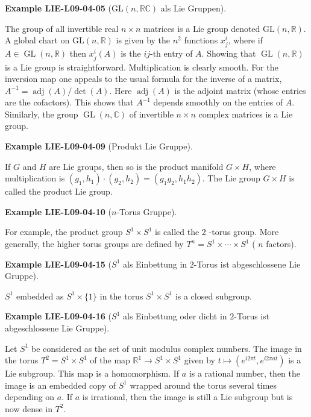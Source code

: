 \documentclass[10pt, letterpaper]{article}
\newcommand{\R}{\mathbb{R}}
\newcommand{\C}{\mathbb{C}}
\newcommand{\GL}{\mathrm{GL}}
\newcommand{\CustomHeading}[3]{%
  \par\medskip\noindent%
  \textbf{#1 #2} \textnormal{(#3)}.\enskip%
}
\newenvironment{EXA}[2]{\CustomHeading{Example}{#1}{#2}}{}
\begin{document}
\begin{EXA}{LIE-L09-04-05}{$\GL(n,\R \C)$ als Lie Gruppen}
The group of all invertible real $n \times n$ matrices is a Lie group denoted $\mathrm{GL}(n, \mathbb{R})$. A global chart on $\mathrm{GL}(n, \mathbb{R})$ is given by the $n^{2}$ functions $x_{j}^{i}$, where if $A \in \operatorname{GL}(n, \mathbb{R})$ then $x_{j}^{i}(A)$ is the $i j$-th entry of $A$. Showing that $\operatorname{GL}(n, \mathbb{R})$ is a Lie group is straightforward. Multiplication is clearly smooth. For the inversion map one appeals to the usual formula for the inverse of a matrix, $A^{-1}= \operatorname{adj}(A) / \operatorname{det}(A)$. Here $\operatorname{adj}(A)$ is the adjoint matrix (whose entries are the cofactors). This shows that $A^{-1}$ depends smoothly on the entries of $A$. Similarly, the group $\operatorname{GL}(n, \mathbb{C})$ of invertible $n \times n$ complex matrices is a Lie group.
\end{EXA}

\begin{EXA}{LIE-L09-04-09}{Produkt Lie Gruppe}
If $G$ and $H$ are Lie groups, then so is the product manifold $G \times H$, where multiplication is $\left(g_{1}, h_{1}\right) \cdot\left(g_{2}, h_{2}\right)=\left(g_{1} g_{2}, h_{1} h_{2}\right)$. The Lie group $G \times H$ is called the product Lie group.
\end{EXA}

\begin{EXA}{LIE-L09-04-10}{$n$-Torus Gruppe}
For example, the product group $S^{1} \times S^{1}$ is called the 2 -torus group. More generally, the higher torus groups are defined by $T^{n}=S^{1} \times \cdots \times S^{1}$ ( $n$ factors).
\end{EXA}

\begin{EXA}{LIE-L09-04-15}{$S^1$ als Einbettung in $2$-Torus ist abgeschlossene Lie Gruppe}
$S^{1}$ embedded as $S^{1} \times\{1\}$ in the torus $S^{1} \times S^{1}$ is a closed subgroup.
\end{EXA}

\begin{EXA}{LIE-L09-04-16}{$S^1$ als Einbettung oder dicht in $2$-Torus ist abgeschlossene Lie Gruppe}
Let $S^{1}$ be considered as the set of unit modulus complex numbers. The image in the torus $T^{2}=S^{1} \times S^{1}$ of the map $\mathbb{R}^{1} \rightarrow S^{1} \times S^{1}$ given by $t \mapsto\left(e^{i 2 \pi t}, e^{i 2 \pi a t}\right)$ is a Lie subgroup. This map is a homomorphism. If $a$ is a rational number, then the image is an embedded copy of $S^{1}$ wrapped around the torus several times depending on $a$. If $a$ is irrational, then the image is still a Lie subgroup but is now dense in $T^{2}$.
\end{EXA}
\end{document}
